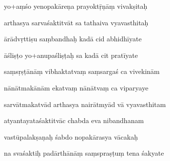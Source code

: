 \documentclass[article,12pt,a4paper]{memoir}%
\newcounter{parCount}
\begin{document}
	  
	  \pstart {} yo+aṃśo yenopakāreṇa prayoktṝṇāṃ vivakṣitaḥ 
	{}
	\pend%
      

	  
	  \pstart \leavevmode%
	arthasya sarvaśaktitvāt sa tathaiva vyavasthitaḥ 
	{}
	\pend%
      

	  
	  \pstart {} ārādvṛttiṣu saṃbandhaḥ kadā cid abhidhīyate 
	{}
	\pend%
      

	  
	  \pstart \leavevmode%
	āśliṣṭo yo+anupaśliṣṭaḥ sa kadā cit pratīyate 
	{}
	\pend%
      

	  
	  \pstart {} saṃsṛṣṭānāṃ vibhaktatvaṃ saṃsargaś ca vivekinām 
	{}
	\pend%
      

	  
	  \pstart \leavevmode%
	nānātmakānām ekatvaṃ nānātvaṃ ca viparyaye 
	{}
	\pend%
      

	  
	  \pstart {} sarvātmakatvād arthasya nairātmyād vā vyavasthitam 
	{}
	\pend%
      

	  
	  \pstart \leavevmode%
	atyantayataśaktitvāc chabda eva nibandhanam 
	{}
	\pend%
      

	  
	  \pstart {} vastūpalakṣaṇaḥ śabdo nopakārasya vācakaḥ 
	{}
	\pend%
      

	  
	  \pstart \leavevmode%
	na svaśaktiḥ padārthānāṃ saṃspraṣṭuṃ tena śakyate 
	{}
	\pend%
      
\end{document}
